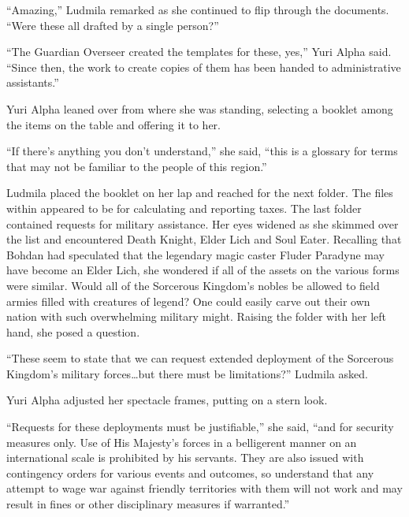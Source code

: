  

“Amazing,” Ludmila remarked as she continued to flip through the documents. “Were these all drafted by a single person?”

 

“The Guardian Overseer created the templates for these, yes,” Yuri Alpha said. “Since then, the work to create copies of them has been handed to administrative assistants.”

 

Yuri Alpha leaned over from where she was standing, selecting a booklet among the items on the table and offering it to her.

 

“If there’s anything you don’t understand,” she said, “this is a glossary for terms that may not be familiar to the people of this region.”

 

Ludmila placed the booklet on her lap and reached for the next folder. The files within appeared to be for calculating and reporting taxes. The last folder contained requests for military assistance. Her eyes widened as she skimmed over the list and encountered Death Knight, Elder Lich and Soul Eater. Recalling that Bohdan had speculated that the legendary magic caster Fluder Paradyne may have become an Elder Lich, she wondered if all of the assets on the various forms were similar. Would all of the Sorcerous Kingdom’s nobles be allowed to field armies filled with creatures of legend? One could easily carve out their own nation with such overwhelming military might. Raising the folder with her left hand, she posed a question.

 

“These seem to state that we can request extended deployment of the Sorcerous Kingdom’s military forces…but there must be limitations?” Ludmila asked.

 

Yuri Alpha adjusted her spectacle frames, putting on a stern look.

 

“Requests for these deployments must be justifiable,” she said, “and for security measures only. Use of His Majesty’s forces in a belligerent manner on an international scale is prohibited by his servants. They are also issued with contingency orders for various events and outcomes, so understand that any attempt to wage war against friendly territories with them will not work and may result in fines or other disciplinary measures if warranted.”

